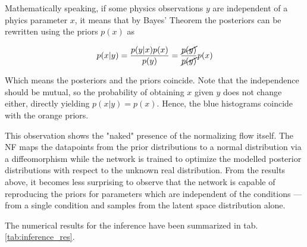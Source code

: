 Mathematically speaking, if some physics observations $y$ are independent of a phyics parameter $x$, it means that by Bayes' Theorem the posteriors can be rewritten using the priors $p(x)$ as

\begin{equation*}
	p(x|y) = \frac{p(y|x)p(x)}{p(y)} = \frac{\cancel{p(y)}}{\cancel{p(y)}} p(x)
\end{equation*}

Which means the posteriors and the priors coincide. Note that the independence should be mutual, so the probability of obtaining $x$ given $y$ does not change either, directly yielding $p(x|y) = p(x)$. Hence, the blue histograms coincide with the orange priors.

This observation shows the "naked" presence of the normalizing flow itself. The NF maps the datapoints from the prior distributions to a normal distribution via a diffeomorphism while the network is trained to optimize the modelled posterior distributions with respect to the unknown real distribution. From the results above, it becomes less surprising to observe that the network is capable of reproducing the priors for parameters which are independent of the conditions --- from a single condition and samples from the latent space distribution alone.

The numerical results for the inference have been summarized in tab. \ref{tab:inference_res}.

